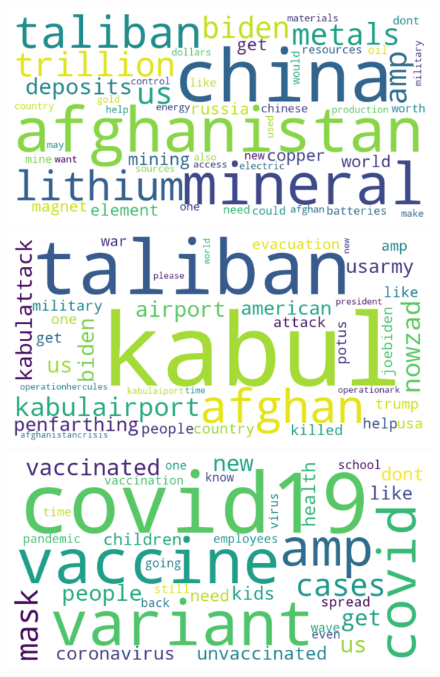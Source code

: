 \documentclass[12pt,%
               a4paper,%
               oneside,openany,%
               titlepage,%
               headinclude,footinclude,%
               BCOR5mm,%
               cleardoublepage=empty,%
               tablecaptionabove,%
               floatperchapter,
               ]{scrreprt}                 %
\begin{document}
\begin{figure}[ht]
   \begin{minipage}[b]{0.5\linewidth}
    \centering
    \includegraphics[width=.9\linewidth]{Figures/WordCloud_Rareearth.png}
    \vspace{4ex}
  \end{minipage}
  \begin{minipage}[b]{0.5\linewidth}
    \centering
    \includegraphics[width=.9\linewidth]{Figures/WordCloud_Afghanistan.png}
    \vspace{4ex}
  \end{minipage}
  \begin{minipage}[b]{0.5\linewidth}
    \centering
    \includegraphics[width=.9\linewidth]{Figures/WordCloud_delta.png}

\end{minipage}
\end{figure}
\end{document}
